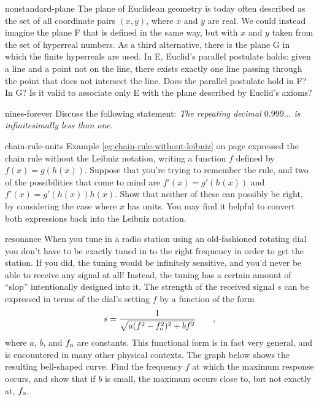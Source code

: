 \begin{hwsection}
\begin{hwwithsoln}[2]{nonstandard-plane}
The plane of Euclidean geometry is today often described as the set of all coordinate pairs $(x,y)$, where
$x$ and $y$ are real. We could instead imagine the plane F that is defined in the same way, but with $x$ and $y$ taken from the
set of hyperreal numbers. As a third alternative, there is the plane G in which the finite hyperreals are used.
In E, Euclid's parallel postulate holds: given a line and a point not on the line, there exists exactly one line passing
through the point that does not intersect the line. Does the parallel postulate hold in F? In G?
Is it valid to associate only E with the plane described by Euclid's axioms?
\end{hwwithsoln}

\begin{hwwithsoln}{nines-forever}
Discuss the following statement: \emph{The repeating decimal $0.999\ldots$ is infinitesimally less than one}.
\end{hwwithsoln}

\begin{hwwithsoln}{chain-rule-units}
Example \ref{eg:chain-rule-without-leibniz} on page \pageref{eg:chain-rule-without-leibniz}
expressed the chain rule without the Leibniz notation, writing a function $f$ defined by
$f(x)=g(h(x))$. Suppose that you're trying to remember the rule, and two of the possibilities
that come to mind are $f'(x)=g'(h(x))$ and $f'(x)=g'(h(x))h(x)$. Show that neither of these
can possibly be right, by considering the case where $x$ has units. You may find it helpful
to convert both expressions back into the Leibniz notation.
\end{hwwithsoln}

\begin{hwwithsoln}{resonance}
When you tune in a radio station using an old-fashioned rotating dial you don't have to be
exactly tuned in to the right frequency in order to get the station. If you did, the
tuning would be infinitely sensitive, and you'd never be able to receive any signal at
all! Instead, the tuning has a certain amount of ``slop'' intentionally designed into it.
The strength of the received signal $s$ can be expressed in terms of the dial's setting
$f$ by a function of the form
\begin{equation*}
  s = \frac{1}{\sqrt{a(f^2-f_{\textup{o}}^2)^2+bf^2}} \qquad ,
\end{equation*}
where $a$, $b$, and $f_{\textup{o}}$ are constants. This functional form is in fact very general, and
is encountered in many other physical contexts. The graph below shows the resulting bell-shaped
curve. Find the frequency $f$ at which the maximum response occurs, and show that if $b$ is small,
the maximum occurs close to, but not exactly at, $f_{\textup{o}}$.
\end{hwwithsoln}


\end{hwsection}
